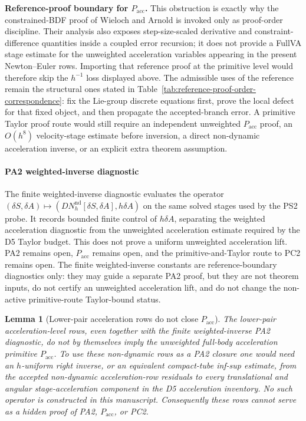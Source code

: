 \documentclass[preprint,12pt]{elsarticle}
\newtheorem{lemma}{Lemma}
\begin{document}
\noindent\textbf{Reference-proof boundary for \(P_{\mathrm{acc}}\).}
This obstruction is exactly why the constrained-BDF proof of
Wieloch and Arnold is invoked only as proof-order discipline.  Their analysis
also exposes step-size-scaled derivative and constraint-difference quantities
inside a coupled error recursion; it does not provide a FullVA stage estimate
for the unweighted acceleration variables appearing in the present
Newton--Euler rows.  Importing that reference proof at the primitive level
would therefore skip the \(h^{-1}\) loss displayed above.  The admissible
uses of the reference remain the structural ones stated in
Table~\ref{tab:reference-proof-order-correspondence}: fix the Lie-group
discrete equations first, prove the local defect for that fixed object, and
then propagate the accepted-branch error.  A primitive Taylor proof route
would still require an independent unweighted \(P_{\mathrm{acc}}\) proof, an
\(O(h^8)\) velocity-stage estimate before inversion, a direct non-dynamic
acceleration inverse, or an explicit extra theorem assumption.

\paragraph{PA2 weighted-inverse diagnostic}
The finite weighted-inverse diagnostic evaluates the operator
\((\delta S,\delta A)\mapsto(DN_h^{\mathrm{nd}}[\delta S,\delta A],
h\delta A)\) on the same solved stages used by the PS2 probe.  It records
bounded finite control of \(h\delta A\), separating the weighted
acceleration diagnostic from the unweighted acceleration estimate required by
the D5 Taylor budget.  This does not prove a uniform unweighted acceleration
lift.  PA2 remains open, \(P_{\mathrm{acc}}\) remains open, and the
primitive-and-Taylor route to PC2 remains open.  The finite weighted-inverse
constants are reference-boundary diagnostics only: they may guide a separate
PA2 proof, but they are not theorem inputs, do not certify an unweighted
acceleration lift, and do not change the non-active primitive-route
Taylor-bound status.

\begin{lemma}[Lower-pair acceleration rows do not close \(P_{\mathrm{acc}}\)]
\label{lem:d5-p-acc-lower-pair-nonclosure}
The lower-pair acceleration-level rows, even together with the finite
weighted-inverse PA2 diagnostic, do not by themselves imply the unweighted
full-body acceleration primitive \(P_{\mathrm{acc}}\).  To use these
non-dynamic rows as a PA2 closure one would need an \(h\)-uniform right
inverse, or an equivalent compact-tube inf-sup estimate, from the accepted
non-dynamic acceleration-row residuals to every translational and angular
stage-acceleration component in the D5 acceleration inventory.  No such
operator is constructed in this manuscript.  Consequently these rows cannot
serve as a hidden proof of PA2, \(P_{\mathrm{acc}}\), or PC2.
\end{lemma}
\end{document}
